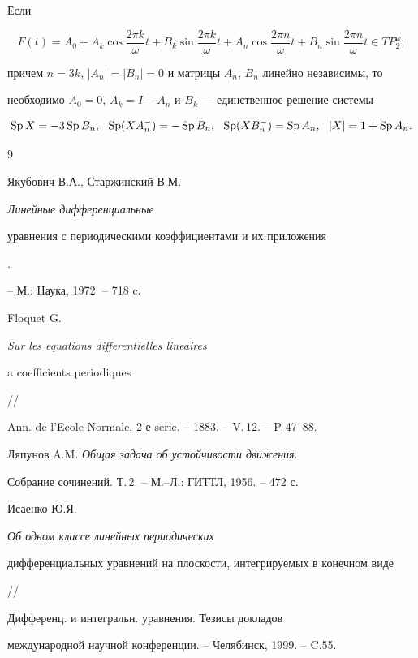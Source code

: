 \begin{thm} 


Если 


$$ 


F(t)=A_0+A_k\cos\frac{2\pi k}{\omega}t+B_k 


\sin\frac{2\pi k}{\omega}t+A_n 


\cos\frac{2\pi n}{\omega}t+B_n 


\sin\frac{2\pi n}{\omega}t\in T P^\omega_2, 


$$ 


причем $n=3k$, $|A_n|=|B_n|=0$ и матрицы $A_n$, $B_n$ линейно независимы, то 


необходимо $A_0=0$, $A_k=I-A_n$ и $B_k$ --- единственное решение системы 


$$ 


\Sp X=-3\Sp B_n,\ \ \Sp(X A^-_n)=-\Sp B_n,\ \ 


\Sp(X B^-_n)=\Sp A_n,\ \ |X|=1+\Sp A_n. 


$$ 


\end{thm} 


 


 


\begin{thebibliography}{9} 


 




Якубович В.А., Старжинский В.М. {\em Линейные дифференциальные 


уравнения с периодическими коэффициентами и их приложения}. 


-- М.: Наука, 1972. -- 718 c. 




Floquet G. {\em Sur les equations differentielles lineaires 


a coefficients periodiques} // 


Ann. de l'Ecole Normale, 2-е serie. -- 1883. -- V.\,12. -- P.\,47--88. 




Ляпунов A.M. {\em Общая задача об устойчивости движения}. 


Собрание сочинений. Т.\,2. -- М.--Л.: ГИТТЛ, 1956. -- 472 с. 




Исаенко Ю.Я. {\em Об одном классе линейных периодических 


дифференциальных уравнений на плоскости, интегрируемых в конечном виде} // 


Дифференц. и интегральн. уравнения. Тезисы докладов 


международной научной конференции. -- Челябинск, 1999. -- C.55. 


 


\end{thebibliography} 


 


\vskip 2cm 


 






 


\label{end} 


 


